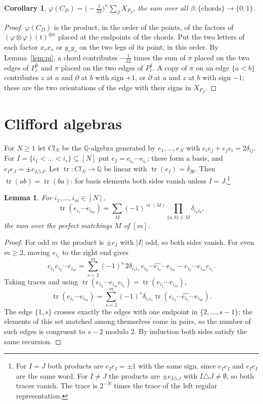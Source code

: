 \documentclass[11pt,a4paper,reqno]{amsart}
\newtheorem{lemma}[theorem]{Lemma}
\newtheorem{corollary}[theorem]{Corollary}
\theoremstyle{definition}
\newcommand{\Q}{\mathbb{Q}}
\newcommand{\tr}{\operatorname{tr}}
\newcommand{\cro}{\operatorname{cr}}
\newcommand{\dd}{\partial}
\begin{document}
\begin{corollary}\label{cor:legs}
$\varphi(C_D)=\bigl(-\frac{1}{32}\bigr)^n\sum_\beta X_{P_\beta}$, the sum over all $\beta\colon\{\text{chords}\}\to\{0,1\}$.
\end{corollary}

\begin{proof}
$\varphi(C_D)$ is the product, in the order of the points, of the factors of $(\varphi\otimes\varphi)(t)^{\otimes n}$ placed at the endpoints of the chords. Put the two letters of each factor $x_rx_s$ or $y_ry_s$ on the two legs of its point, in this order. By Lemma~\ref{lem:pi}, a chord contributes $-\frac1{32}$ times the sum of $\pi$ placed on the two edges of $P_c^0$ and $\pi$ placed on the two edges of $P_c^1$. A copy of $\pi$ on an edge $\{a<b\}$ contributes $z$ at $a$ and $\dd$ at $b$ with sign $+1$, or $\dd$ at $a$ and $z$ at $b$ with sign $-1$; these are the two orientations of the edge with their signs in $X_{P_\beta}$.
\end{proof}

\section{Clifford algebras}\label{sec:clifford}

For $N\ge1$ let $Cl_N$ be the $\Q$-algebra generated by $e_1,\dots,e_N$ with $e_ie_j+e_je_i=2\delta_{ij}$. For $I=\{i_1<\dots<i_r\}\subseteq[N]$ put $e_I=e_{i_1}\cdots e_{i_r}$; these form a basis, and $e_Ie_J=\pm e_{I\triangle J}$. Let $\tr\colon Cl_N\to\Q$ be linear with $\tr(e_I)=\delta_{I\emptyset}$. Then $\tr(ab)=\tr(ba)$: for basis elements both sides vanish unless $I=J$.\footnote{For $I=J$ both products are $e_Ie_I=\pm1$ with the same sign, since $e_Ie_I$ and $e_Ie_I$ are the same word. For $I\ne J$ the products are $\pm e_{I\triangle J}$ with $I\triangle J\ne\emptyset$, so both traces vanish. The trace is $2^{-N}$ times the trace of the left regular representation.}

\begin{lemma}\label{lem:cliffwick}
For $i_1,\dots,i_m\in[N]$,
\[
\tr(e_{i_1}\cdots e_{i_m})=\sum_M(-1)^{\cro(M)}\prod_{\{a,b\}\in M}\delta_{i_ai_b},
\]
the sum over the perfect matchings $M$ of $[m]$.
\end{lemma}

\begin{proof}
For odd $m$ the product is $\pm e_I$ with $|I|$ odd, so both sides vanish. For even $m\ge2$, moving $e_{i_1}$ to the right end gives
\[
e_{i_1}e_{i_2}\cdots e_{i_m}=\sum_{s=2}^m(-1)^{s}\,2\delta_{i_1i_s}\,e_{i_2}\cdots\widehat{e_{i_s}}\cdots e_{i_m}-e_{i_2}\cdots e_{i_m}e_{i_1}.
\]
Taking traces and using $\tr(e_{i_2}\cdots e_{i_m}e_{i_1})=\tr(e_{i_1}\cdots e_{i_m})$,
\[
\tr(e_{i_1}\cdots e_{i_m})=\sum_{s=2}^m(-1)^s\delta_{i_1i_s}\tr(e_{i_2}\cdots\widehat{e_{i_s}}\cdots e_{i_m}).
\]
The edge $\{1,s\}$ crosses exactly the edges with one endpoint in $\{2,\dots,s-1\}$; the elements of this set matched among themselves come in pairs, so the number of such edges is congruent to $s-2$ modulo $2$. By induction both sides satisfy the same recursion.
\end{proof}
\end{document}
